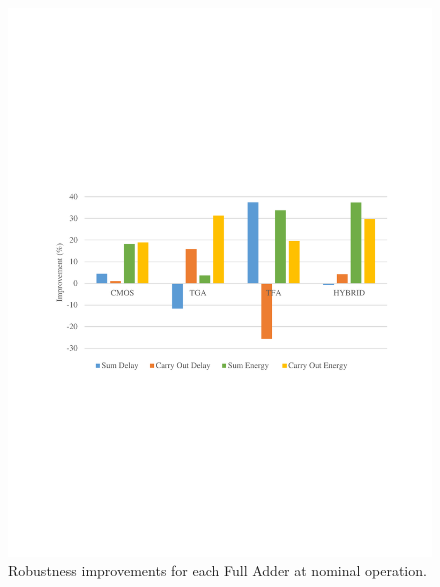 \documentclass[ecp,tc, english]{iiufrgs}
\begin{document}
\begin{figure}[H]
\centering
\includegraphics[width=\textwidth, trim={0 9.5cm 0 9cm},clip]{improvNominal.pdf}
\caption{Robustness improvements for each Full Adder at nominal operation.}
\label{fig:Fig41}
\end{figure}
\end{document}
